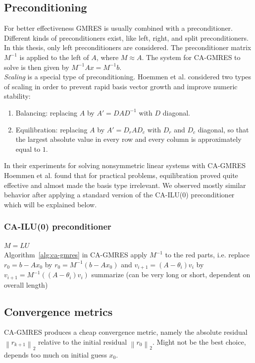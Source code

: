 \documentclass{scrartcl}
\numberwithin{equation}{section}
\newcommand{\norm}[1]{\left\lVert#1\right\rVert}
\begin{document}
\subsection{Preconditioning}
For better effectiveness GMRES is usually combined with a preconditioner. Different kinds of preconditioners exist, like left, right, and split preconditioners. In this thesis, only left preconditioners are considered. The preconditioner matrix $M^{-1}$ is applied to the left of $A$, where $M \approx A$. The system for CA-GMRES to solve is then given by $M^{-1}Ax = M^{-1}b$.\\

\textit{Scaling} is a special type of preconditioning. Hoemmen et al. \cite{Hoemmen:2010:CKS:1970638} considered two types of scaling in order to prevent rapid basis vector growth and improve numeric stability:
\begin{enumerate}
\item Balancing: replacing $A$ by $A' = DAD^{-1}$ with $D$ diagonal.
\item Equilibration: replacing $A$ by $A' = D_rAD_c$ with $D_r$ and $D_c$ diagonal, so that the largest absolute value in every row and every column is approximately equal to $1$.
\end{enumerate}
In their experiments for solving nonsymmetric linear systems with CA-GMRES Hoemmen et al. \cite{Hoemmen:2010:CKS:1970638} found that for practical problems, equilibration proved quite effective and almost made the basis type irrelevant. We observed mostly similar behavior after applying a standard version of the CA-ILU(0) preconditioner which will be explained below.

\subsubsection{CA-ILU(0) preconditioner} \label{sec:ca-ilu}
$M = LU$ \\
Algorithm~\ref{alg:ca-gmres} in CA-GMRES apply $M^{-1}$ to the red parts, i.e. replace $r_0 = b - Ax_0$ by $r_0 = M^{-1}(b - Ax_0)$ and  $v_{i + 1} = (A - \theta_i)v_i$ by $v_{i + 1} = M^{-1}((A - \theta_i)v_i)$
summarize \cite{Grigori} (can be very long or short, dependent on overall length)
\subsection{Convergence metrics}
CA-GMRES produces a cheap convergence metric, namely the absolute residual $\norm{r_{k+1}}_2$ relative to the initial residual $\norm{r_0}_2$. Might not be the best choice, depends too much on initial guess $x_0$.\\
\end{document}
